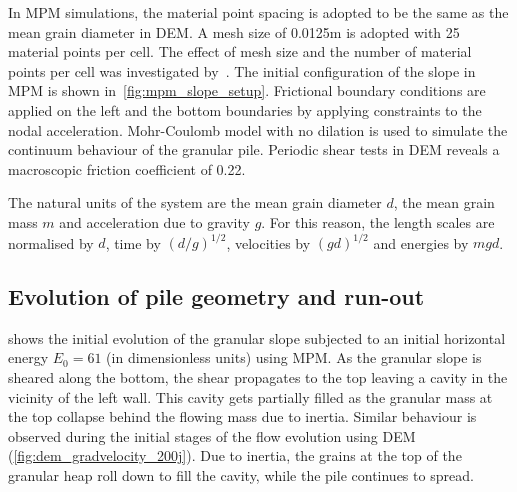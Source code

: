 \documentclass[3p,times,procedia,number]{elsarticle}
\begin{document}
In MPM simulations, the material point spacing is adopted to be the same as the 
mean grain diameter in DEM. A mesh size of 0.0125m is adopted with 25 material 
points per cell. The effect of mesh size and the number of material points per 
cell was investigated by~\citep{Soundararajan2015}. The initial configuration
of the slope in MPM is shown in~\cref{fig:mpm_slope_setup}. Frictional boundary
conditions are applied on the left and the bottom boundaries by applying
constraints to the nodal acceleration. Mohr-Coulomb model with no dilation is
used to simulate the continuum behaviour of the granular pile. Periodic shear
tests in DEM reveals a macroscopic friction coefficient of 0.22.

The natural units of the system are the mean grain diameter $d$, the mean grain 
mass $m$ and acceleration due to gravity $g$. For this reason, the length 
scales are normalised by $d$, time by $(d/g)^{1/2}$, velocities by $(gd)^{1/2}$ 
and energies by $mgd$. 

\subsection{Evolution of pile geometry and run-out}
\label{sec:evolution}

 shows the initial evolution of the 
granular slope subjected to an initial horizontal energy $E_0 = 61$ (in 
dimensionless units) using MPM. As the granular slope is sheared along the 
bottom, the shear propagates to the top leaving a cavity in the vicinity of the 
left wall. This cavity gets partially filled as the granular mass at the top 
collapse behind the flowing mass due to inertia. Similar behaviour is observed 
during the initial stages of the flow evolution using DEM  
(\cref{fig:dem_gradvelocity_200j}). Due to inertia, the grains at the top 
of the granular heap roll down to fill the cavity, while the pile continues to 
spread. 
\end{document}
